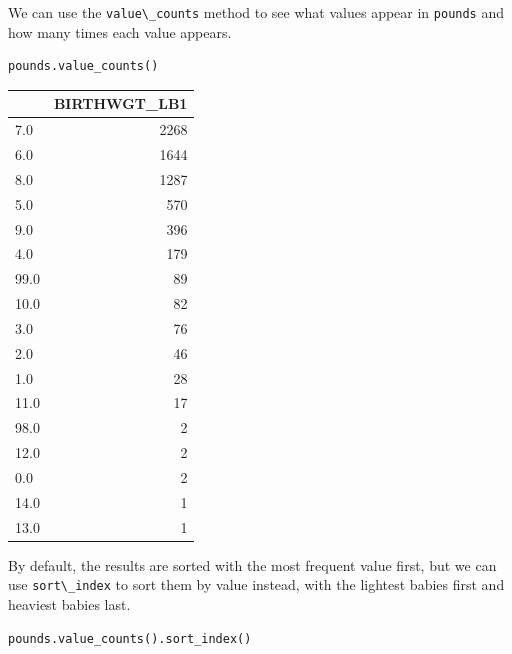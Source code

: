 We can use the \passthrough{\lstinline!value\_counts!} method to see
what values appear in \passthrough{\lstinline!pounds!} and how many
times each value appears.

\begin{lstlisting}[]
pounds.value_counts()
\end{lstlisting}

\begin{tabular}{lr}
\midrule
{} &  BIRTHWGT\_LB1 \\
\midrule
7.0  &          2268 \\
6.0  &          1644 \\
8.0  &          1287 \\
5.0  &           570 \\
9.0  &           396 \\
4.0  &           179 \\
99.0 &            89 \\
10.0 &            82 \\
3.0  &            76 \\
2.0  &            46 \\
1.0  &            28 \\
11.0 &            17 \\
98.0 &             2 \\
12.0 &             2 \\
0.0  &             2 \\
14.0 &             1 \\
13.0 &             1 \\
\midrule
\end{tabular}

By default, the results are sorted with the most frequent value first,
but we can use \passthrough{\lstinline!sort\_index!} to sort them by
value instead, with the lightest babies first and heaviest babies last.

\begin{lstlisting}[]
pounds.value_counts().sort_index()
\end{lstlisting}

